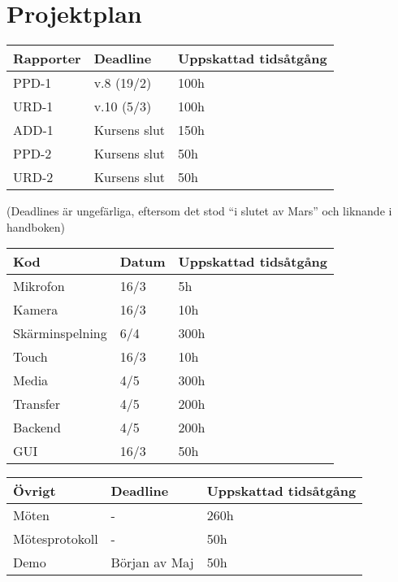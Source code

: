 
\section{Projektplan}


\begin{center}
    \begin{tabular}{ | l | l | l |}
    \hline
    Rapporter & Deadline & Uppskattad tidsåtgång \\ \hline
    PPD-1 & v.8 (19/2) & 100h \\ \hline
    URD-1 & v.10 (5/3) & 100h \\ \hline
    ADD-1 & Kursens slut & 150h \\ \hline
    PPD-2 & Kursens slut & 50h \\ \hline
    URD-2 & Kursens slut & 50h \\ \hline
    \end{tabular}
\end{center}

(Deadlines är ungefärliga, eftersom det stod “i slutet av Mars” och liknande i handboken)

\begin{center}
    \begin{tabular}{ | l | l | l |}
    \hline
    Kod & Datum & Uppskattad tidsåtgång \\ \hline
    Mikrofon & 16/3 & 5h \\ \hline
    Kamera & 16/3 & 10h  \\ \hline
    Skärminspelning & 6/4 & 300h \\ \hline
    Touch & 16/3 & 10h \\ \hline
    Media & 4/5 & 300h \\ \hline
    Transfer & 4/5 & 200h \\ \hline
    Backend & 4/5 & 200h \\ \hline
    GUI & 16/3 & 50h \\ \hline
    \end{tabular}
\end{center}

\begin{center}
    \begin{tabular}{ | l | l | l | }
    \hline
    Övrigt & Deadline & Uppskattad tidsåtgång \\ \hline
    Möten & - & 260h \\ \hline
    Mötesprotokoll & - & 50h \\ \hline
    Demo & Början av Maj & 50h \\ \hline
    \end{tabular}
\end{center}

